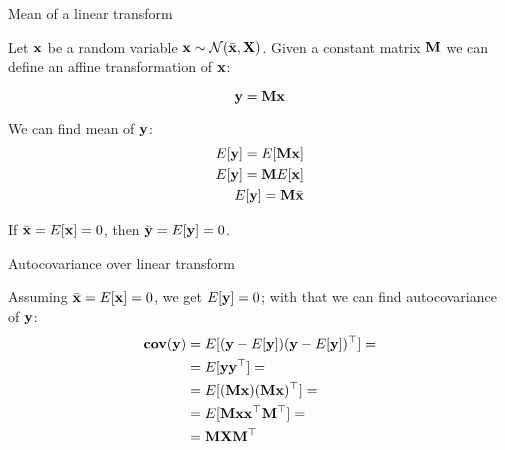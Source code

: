 \documentclass{beamer}
\begin{document}
\begin{frame}{Mean of a linear transform}
	\begin{flushleft}
		
		Let $\mathbf{x}$ be a random variable $\mathbf{x} \sim \mathcal{N} (\bar{\mathbf{x}}, \mathbf{X})$.  Given a constant matrix $\mathbf{M}$ we can define an affine transformation of $\mathbf{x}$:
		
		\begin{equation}
			\mathbf{y} = \mathbf{M}\mathbf{x}
		\end{equation}
		
		We can find mean of $\mathbf{y}$:
		\begin{align}
			E[\mathbf{y}] = E[\mathbf{M}\mathbf{x}] \\
			E[\mathbf{y}] = \mathbf{M}E[\mathbf{x}] \\
			E[\mathbf{y}] = \mathbf{M}\bar{\mathbf{x}}
		\end{align}
		
		If $\bar{\mathbf{x}} = E[\mathbf{x}] = 0$, then $\bar{\mathbf{y}} = E[\mathbf{y}] = 0$.
		
	\end{flushleft}
\end{frame}



\begin{frame}{Autocovariance over linear transform}
	\begin{flushleft}
		
		Assuming $\bar{\mathbf{x}} = E[\mathbf{x}] = 0$, we get $E[\mathbf{y}] = 0$; with that we can find autocovariance of $\mathbf{y}$:
		\begin{align*}
			\textbf{cov}(\mathbf{y}) &= E[(\mathbf{y} - E[\mathbf{y}])(\mathbf{y} - E[\mathbf{y}])^\top] =
			\\
			&=E[\mathbf{y}\mathbf{y}^\top] =
			\\
			&=E[(\mathbf{M}\mathbf{x})(\mathbf{M}\mathbf{x})^\top]=
			\\
			&=E[\mathbf{M}\mathbf{x}\mathbf{x}^\top \mathbf{M}^\top]=
			\\
			&=\mathbf{M}\mathbf{X} \mathbf{M}^\top
		\end{align*}
		
	\end{flushleft}
\end{frame}
\end{document}
